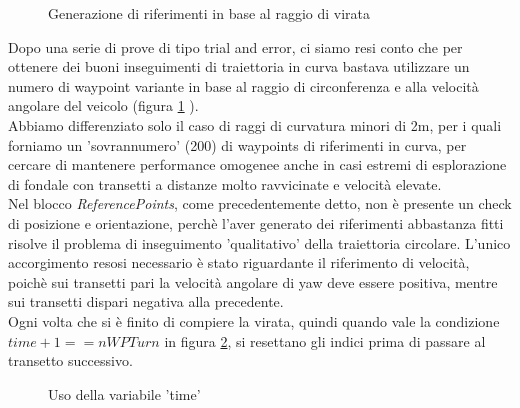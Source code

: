 \documentclass{article}
\begin{document}
            \begin{figure} [ht]
                \caption{Generazione di riferimenti in base al raggio di virata}
                \label{fig:raggio}
            \end{figure}


            Dopo una serie di prove di tipo trial and error, ci siamo resi conto che per ottenere dei buoni inseguimenti di traiettoria in curva bastava utilizzare un numero
            di waypoint variante in base al raggio di circonferenza e alla velocità angolare del veicolo (figura \ref{fig:raggio} ).\\
            Abbiamo differenziato solo il caso di raggi di curvatura minori di 2m, per i quali forniamo un 'sovrannumero' (200) 
            di waypoints di riferimenti in curva, per cercare di mantenere performance omogenee anche in casi estremi di esplorazione di 
            fondale con transetti a distanze molto ravvicinate e velocità elevate.\\
            Nel blocco \emph{ReferencePoints}, come precedentemente detto, non è presente un check di posizione e orientazione, perchè l'aver generato dei riferimenti 
            abbastanza fitti risolve il problema di inseguimento 'qualitativo' della traiettoria circolare. L'unico accorgimento resosi necessario è stato riguardante il
            riferimento di velocità, poichè sui transetti pari la velocità angolare di yaw deve essere positiva, mentre sui transetti dispari negativa alla precedente.\\
            Ogni volta che si è finito di compiere la virata, quindi quando vale la condizione  $time + 1 == nWPTurn$ in figura \ref{fig:time}, si resettano gli indici prima di passare al transetto successivo.

            \begin{figure} [ht]
                \caption{Uso della variabile 'time'}
                \label{fig:time}
            \end{figure}
\end{document}
